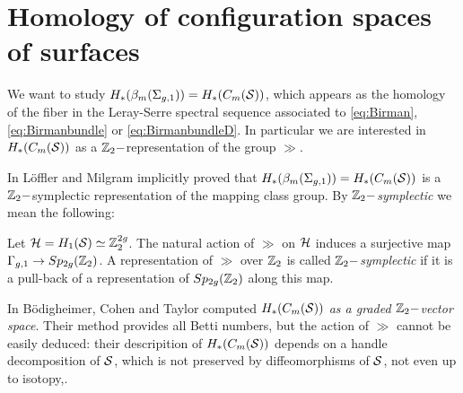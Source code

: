\section{Homology of configuration spaces of surfaces}
\label{sec:HBraidSurf}
We want to study $H_*(\bms)=H_*(\cms)$,
which appears as the homology of the fiber
in the Leray-Serre spectral sequence associated to
\ref{eq:Birman}, \ref{eq:Birmanbundle} or \ref{eq:BirmanbundleD}.
In particular we are interested in $H_*(C_m(\S))$
as a $\Z_2-$representation of the group $\gg$.

In \cite{LM} L\"offler and Milgram implicitly proved that $H_*(\bms)=H_*(\cms)$ is a $\Z_2-$symplectic
representation of the mapping class group. By \emph{$\Z_2-$symplectic} we mean the following:
\begin{defn}
 \label{defn:symplrep}
 Let $\H=H_1(\S)\simeq\Z_2^{2g}$.
 The natural action of $\gg$ on $\H$ induces a surjective map
 $\gg\to Sp_{2g}(\Z_2)$. A representation of $\gg$ over $\Z_2$ is called \emph{$\Z_2-$symplectic}
 if it is a pull-back of a representation of $Sp_{2g}(\Z_2)$ along this map.
\end{defn}

In \cite{BCT} B\"odigheimer, Cohen and Taylor computed $H_*(\cms)$ \emph{as a graded $\Z_2-$vector space}.
Their method provides all Betti numbers, but the action of $\gg$ cannot be easily deduced:
their descripition of $H_*(\cms)$ depends on a handle decomposition of $\S$, which is not preserved
by diffeomorphisms of $\S$, not even up to isotopy,.

